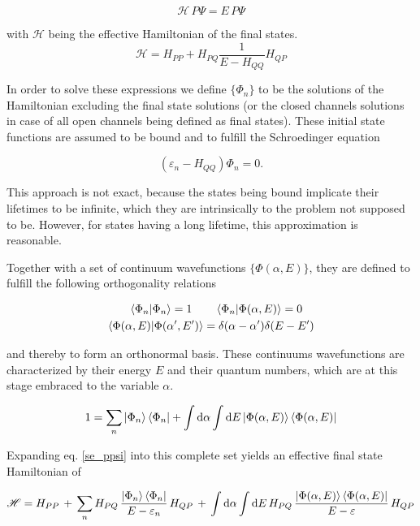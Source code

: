 \begin{equation}
  \mathscr{H} \,P \Psi = E \,P \Psi \label{se_ppsi}
\end{equation}

with $\mathscr{H}$ being the effective Hamiltonian of the final states.
\begin{equation}
  \mathscr{H} = H_{PP} + H_{PQ} \frac{1}{E-H_{QQ}} H_{QP}
\end{equation}

In order to solve these expressions we define $\{\Phi_n\}$ to be the solutions
of the Hamiltonian excluding the final state solutions (or the closed channels
solutions in case of all open channels being defined as final states).
These initial state functions are assumed to be bound and to fulfill the
Schroedinger equation

\begin{equation}
  (\varepsilon_n - H_{QQ}) \Phi_n = 0 .
\end{equation}

This approach is not exact, because the states being bound implicate
their lifetimes to be infinite, which they are intrinsically
to the problem not supposed to be. However, for states having a long lifetime,
this approximation is reasonable.

Together with a set of continuum wavefunctions $\{\Phi(\alpha,E)\}$, they are
defined to fulfill the following orthogonality relations

\begin{align}
  \braket{\Phi_n|\Phi_n} = 1 \quad  & \quad \braket{\Phi_n|\Phi(\alpha,E)} = 0\\
  \braket{\Phi(\alpha,E)|\Phi(\alpha',E')} & = \delta(\alpha-\alpha') \delta(E-E')
\end{align}

and thereby to form an orthonormal basis. These continuums wavefunctions
are characterized
by their energy $E$ and their quantum numbers, which are at this stage embraced
to the variable $\alpha$.

\begin{equation}
  1 = \sum\limits_n \ket{\Phi_n}\bra{\Phi_n} + \int \mathrm{d}\alpha \int \mathrm{d}E
      \ket{\Phi(\alpha,E)}\bra{\Phi(\alpha,E)} \label{feshbach_1}
\end{equation}

Expanding eq. \ref{se_ppsi} into this complete set yields an effective
final state Hamiltonian of

\begin{equation}
  \mathscr{H} = H_{PP}\, + \,
  \sum\limits_n H_{PQ} \,\frac{\ket{\Phi_n}\bra{\Phi_n}}{E-\varepsilon_n}\, H_{QP} \,+\,
  \int \mathrm{d}\alpha \int\mathrm{d}E \,H_{PQ} \,
  \frac{\ket{\Phi(\alpha,E)}\bra{\Phi(\alpha,E)}}{E-\varepsilon} \, H_{QP}
\end{equation}

